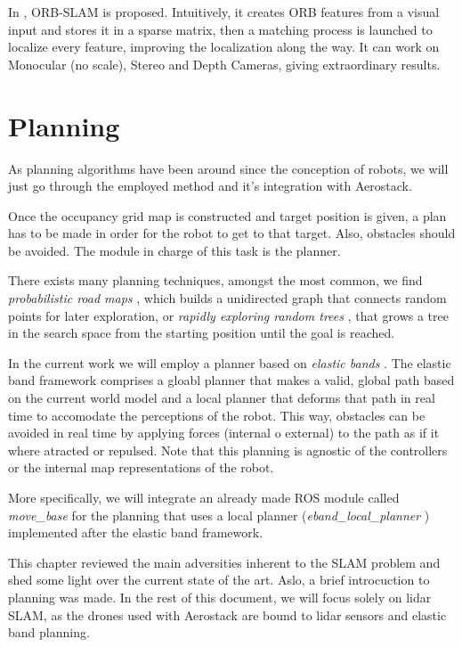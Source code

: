       In \cite{murTRO2015}, ORB-SLAM is proposed. Intuitively, it creates ORB features from a visual input and stores it in a sparse matrix, then a matching process is launched to localize every feature, improving the localization along the way. It can work on Monocular (no scale), Stereo and Depth Cameras, giving extraordinary results.

  \section{Planning} \label{ch_3:sect:planning}

    As planning algorithms have been around since the conception of robots, we will just go through the employed method and it's integration with Aerostack.

    Once the occupancy grid map is constructed and target position is given, a plan has to be made in order for the robot to get to that target. Also, obstacles should be avoided. The module in charge of this task is the planner.

    There exists many planning techniques, amongst the most common, we find \textit{probabilistic road maps} \cite{probabilistic_rmaps}, which builds a unidirected graph that connects random points for later exploration, or \textit{rapidly exploring random trees} \cite{rapidly_exp_rand_trees}, that grows a tree in the search space from the starting position until the goal is reached. 

    In the current work we will employ a planner based on \textit{elastic bands} \cite{eband}. The elastic band framework comprises a gloabl planner that makes a valid, global path based on the current world model and a local planner that deforms that path in real time to accomodate the perceptions of the robot. This way, obstacles can be avoided in real time by applying forces (internal o external) to the path as if it where atracted or repulsed. Note that this planning is agnostic of the controllers or the internal map representations of the robot.

    More specifically, we will integrate an already made ROS module called \textit{move\_base} \cite{move_base_web} for the planning that uses a local planner (\textit{eband\_local\_planner} \cite{eband_planner_web}) implemented after the elastic band framework.

  This chapter reviewed the main adversities inherent to the SLAM problem and shed some light over the current state of the art. Aslo, a brief introcuction to planning was made. In the rest of this document, we will focus solely on lidar SLAM, as the drones used with Aerostack are bound to lidar sensors and elastic band planning.

